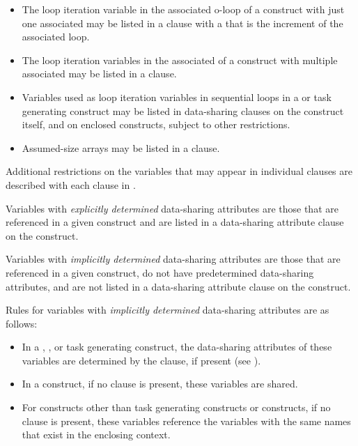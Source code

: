{{{{\begin{itemize}
\item The loop iteration variable in the associated o-loop of a  construct with just 
one associated  may be listed in a  clause with a 
that is the increment of the associated loop.

\item The loop iteration variables in the associated  of a  construct with 
multiple associated  may be listed in a  clause. 

\item Variables used as loop iteration variables in sequential loops in a  
or task generating construct may be listed in data-sharing clauses on the construct itself, and on 
enclosed constructs, subject to other restrictions.

\item Assumed-size arrays may be listed in a  clause.
\end{itemize}
\fortranspecificend

Additional restrictions on the variables that may appear in individual clauses are 
described with each clause in .

Variables with \emph{explicitly determined} data-sharing attributes are those that are referenced 
in a given construct and are listed in a data-sharing attribute clause on the construct.

Variables with \emph{implicitly determined} data-sharing attributes are those that are referenced 
in a given construct, do not have predetermined data-sharing attributes, and are not 
listed in a data-sharing attribute clause on the construct.

Rules for variables with \emph{implicitly determined} data-sharing attributes are as follows:

\begin{itemize}
\item In a , , or task generating construct, the data-sharing attributes of these variables are
determined by the  clause, if present (see
).

\item In a  construct, if no  clause is present, these variables are 
shared.

\item For constructs other than task generating constructs or  constructs, if no  clause is present, these variables reference the variables with the same names that exist in the enclosing context.


\end{itemize}}}}}
